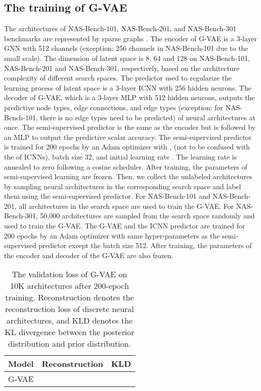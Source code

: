 \documentclass[10pt,twocolumn,letterpaper]{article}
\begin{document}
\subsection{The training of G-VAE} 
The architectures of NAS-Bench-101, NAS-Bench-201, and NAS-Bench-301 benchmarks are represented by sparse graphs \cite{fey2019fast}. The encoder of G-VAE is a 3-layer GNN with 512 channels (exception: 256 channels in NAS-Bench-101 due to the small scale). The dimension of latent space is 8, 64 and 128 on NAS-Bench-101, NAS-Bench-201 and NAS-Bench-301, respectively, based on the architecture complexity of different search spaces. The predictor used to regularize the learning process of latent space is a 3-layer ICNN with 256 hidden neurons. The decoder of G-VAE, which is a 3-layer MLP with 512 hidden neurons, outputs the predictive node types, edge connections, and edge types (exception: for NAS-Bench-101, there is no edge types need to be predicted) of neural architectures at once. The semi-supervised predictor is the same as the encoder but is followed by an MLP to output the predictive scalar accuracy. The semi-supervised predictor is trained for 200 epochs by an Adam optimizer with ,  (not to be confused with the  of ICNNs), batch size 32, and initial learning rate . The learning rate is annealed to zero following a cosine scheduler. After training, the parameters of semi-supervised learning are frozen. Then, we collect the unlabeled architectures by sampling neural architectures in the corresponding search space and label them using the semi-supervised predictor. For NAS-Bench-101 and NAS-Bench-201, all architectures in the search space are used to train the G-VAE. For NAS-Bench-301, 50,000 architectures are sampled from the search space randomly and used to train the G-VAE. The G-VAE and the ICNN predictor are trained for 200 epochs by an Adam optimizer with same hyper-parameters as the semi-supervised predictor except the batch size 512. After training, the parameters of the encoder and decoder of the G-VAE are also frozen. 
\begin{table}
	\centering
	\caption{The validation loss of G-VAE on 10K architectures after 200-epoch training. Reconstruction denotes the reconstruction loss of discrete neural architectures, and KLD denotes the KL divergence between the posterior distribution and prior distribution.}
	\begin{tabular}{c|c|c}
		\toprule
		Model & Reconstruction & KLD \\
		\midrule
		G-VAE &  &   \\
		\bottomrule
	\end{tabular}
\end{table}
\end{document}
